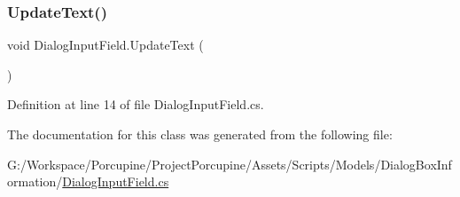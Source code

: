 \subsubsection{\texorpdfstring{Update\+Text()}{UpdateText()}}
{\footnotesize\ttfamily void Dialog\+Input\+Field.\+Update\+Text (\begin{DoxyParamCaption}{ }\end{DoxyParamCaption})}



Definition at line 14 of file Dialog\+Input\+Field.\+cs.



The documentation for this class was generated from the following file\+:\begin{DoxyCompactItemize}
\item 
G\+:/\+Workspace/\+Porcupine/\+Project\+Porcupine/\+Assets/\+Scripts/\+Models/\+Dialog\+Box\+Information/\hyperlink{_dialog_input_field_8cs}{Dialog\+Input\+Field.\+cs}\end{DoxyCompactItemize}
